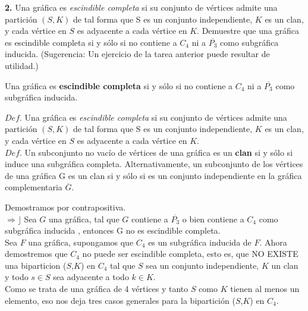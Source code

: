 \documentclass[12pt]{article}
\begin{document}
\vspace{1cm}
%
%
\textbf{2.} Una gráfica es \textit{escindible completa} si su conjunto de vértices admite una partición $(S, K)$
de tal forma que S es un conjunto independiente, $K$ es un clan, y cada vértice en $S$ es
adyacente a cada vértice en $K$. Demuestre que una gráfica es escindible completa si y
sólo si no contiene a $C_4$ ni a $\overline{P_3}$ como subgráfica inducida. (Sugerencia: Un ejercicio de
la tarea anterior puede resultar de utilidad.)
\vspace{1cm}
\begin{tcolorbox}[title=\textbf{Hipótesis}, colback=red!15!white, colframe=black!]
	Una gráfica es \textbf{escindible completa} si y sólo si no contiene a $C_4$ ni a $\overline{P_3}$ como subgráfica inducida.
\end{tcolorbox}
	
\begin{tcolorbox}[title=\textbf{Definiciones}, colback=blue!15!white, colframe=black!]
    $Def$. Una gráfica es \textit{escindible completa} si su conjunto de vértices admite una partición $(S, K)$
de tal forma que S es un conjunto independiente, $K$ es un clan, y cada vértice en $S$ es
adyacente a cada vértice en $K$.\\
	$Def$. Un subconjunto no vacío de vértices de una gráfica es un \textbf{clan} si y sólo si induce una subgráfica completa. Alternativamente, un subconjunto de los vértices de una gráfica G es un clan si y sólo si es un conjunto
independiente en la gráfica complementaria $\overline{G}$.
\end{tcolorbox}

Demostramos por contrapositiva.\\

$\Rightarrow \rfloor$ Sea $G$ una gráfica, tal que $G$ contiene a $\overline{P_3}$ o bien contiene a $C_4$ como subgráfica inducida , entonces G no es escindible completa.   \\

Sea $F$ una gráfica, supongamos que $C_4$ es un subgráfica inducida de $F$. Ahora demostremos que $C_4$ no puede ser escindible completa, esto es, que NO EXISTE una biparticion ($S$,$K$) en $C_4$ tal que $S$ sea un conjunto independiente, $K$ un clan y todo $s \in S$ sea adyacente a todo $k \in K$.\\

Como se trata de una gráfica de 4 vértices y tanto $S$ como $K$ tienen al menos un elemento, eso nos deja tres casos generales para la bipartición ($S$,$K$) en $C_4$.\\
\end{document}
